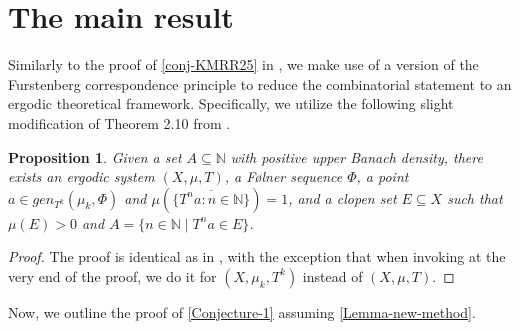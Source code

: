 \documentclass[letter,11pt]{article}
\newtheorem{prop}[theo]{Proposition}
\theoremstyle{definition}
\newcommand{\N}{\mathbb{N}}
\begin{document}
\section{The main result}\label{sec4}
Similarly to the proof of \cref{conj-KMRR25} in \cite{kmrr25}, we make use of a version of the Furstenberg correspondence principle to reduce the combinatorial statement to an ergodic theoretical framework. Specifically, we utilize the following slight modification of Theorem 2.10 from \cite{Kra_Moreira_Richter_Robertson:2022}. 
\begin{prop}\label{theo2.10}
Given a set $A \subseteq \N$ with positive upper Banach density, there exists an ergodic system $(X,\mu,T)$, a F\o lner sequence $\Phi$, a point $a\in gen_{T^k}(\mu_k,\Phi)$ and $\mu(\overline{\{T^na :n\in \N \}})=1$,
and a clopen set $E\subseteq X$ such that $\mu(E) > 0$ and $A = \{n \in \N \mid T^n a \in  E\}$.
\end{prop}
\begin{proof}
    The proof is identical as in \cite{Kra_Moreira_Richter_Robertson:2022}, with the exception that when invoking \cite[Proposition
3.9]{Furstenberg1981} at the very end of the proof, we do it for $(X,\mu_k,T^k)$ instead of $(X,\mu,T)$.
\end{proof}
Now, we outline the proof of \cref{Conjecture-1} assuming \cref{Lemma-new-method}.
\end{document}
